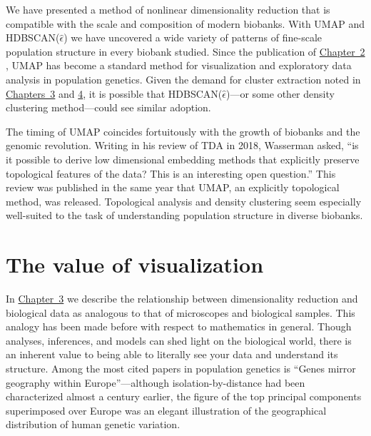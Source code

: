 We have presented a method of nonlinear dimensionality reduction that is compatible with the scale and composition of modern biobanks. With UMAP and HDBSCAN($\hat{\epsilon}$) we have uncovered a wide variety of patterns of fine-scale population structure in every biobank studied. Since the publication of \hyperref[chap:chapter2]{Chapter~2} , UMAP has become a standard method for visualization and exploratory data analysis in population genetics. Given the demand for cluster extraction noted in \hyperref[chap:chapter3]{Chapters~3} and \hyperref[chap:chapter4]{4}, it is possible that HDBSCAN($\hat{\epsilon}$)---or some other density clustering method---could see similar adoption.

The timing of UMAP coincides fortuitously with the growth of biobanks and the genomic revolution. Writing in his review of TDA in 2018, Wasserman asked, ``is it possible to derive low dimensional embedding methods that explicitly preserve topological features of the data? This is an interesting open question.''\citep{wasserman_topological_2018} This review was published in the same year that UMAP, an explicitly topological method, was released. Topological analysis and density clustering seem especially well-suited to the task of understanding population structure in diverse biobanks.

\section{The value of visualization}

In \hyperref[chap:chapter3]{Chapter~3} we describe the relationship between dimensionality reduction and biological data as analogous to that of microscopes and biological samples. This analogy has been made before with respect to mathematics in general\citep{cohen_mathematics_2004}. Though analyses, inferences, and models can shed light on the biological world, there is an inherent value to being able to literally see your data and understand its structure. Among the most cited papers in population genetics is ``Genes mirror geography within Europe''\citep{novembre2008europe}---although isolation-by-distance had been characterized almost a century earlier, the figure of the top principal components superimposed over Europe was an elegant illustration of the geographical distribution of human genetic variation.

